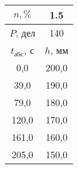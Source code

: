 \begin{tabular}[t]{|c|c|}
\hline
$n, \%$ & 1.5 \\
\hline
$P$, дел & 140 \\
\hline
$t_{абс}$, с & $h$, мм \\ 
\hline
0,0 & 200,0 \\ 
39,0 & 190,0 \\ 
79,0 & 180,0 \\ 
120,0 & 170,0 \\ 
161,0 & 160,0 \\ 
205,0 & 150,0 \\ 
\hline
\end{tabular}